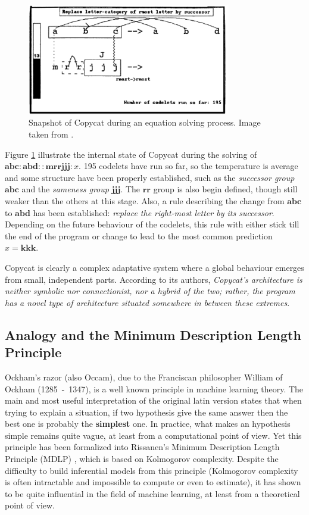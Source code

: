 \begin{figure}[!h]
\centering
  \includegraphics[width=3.5in]{figures/copycat.png}
\caption{Snapshot of Copycat during an equation solving process. Image taken
  from \cite{Mit01}.}
\label{FIG:copycat_snapshot}
\end{figure}

Figure \ref{FIG:copycat_snapshot} illustrate the internal state of Copycat
during the solving of $\mathbf{abc} : \mathbf{abd} :: \mathbf{mrrjjj}: x$. 195
codelets have run so far, so the temperature is average and some structure have
been properly established, such as the \textit{successor group} $\mathbf{abc}$
and the \textit{sameness group} $\mathbf{jjj}$. The $\mathbf{rr}$ group is also
begin defined, though still weaker than the others at this stage. Also, a rule
describing the change from $\mathbf{abc}$ to $\mathbf{abd}$ has been
established: \textit{replace the right-most letter by its successor}. Depending
on the future behaviour of the codelets, this rule with either stick till the
end of the program or change to lead to the most common prediction $x =
\mathbf{kkk}$.

Copycat is clearly a complex adaptative system where a global behaviour emerges
from small, independent parts. According to its authors, \textit{Copycat's
architecture is neither symbolic nor connectionist, nor a hybrid of the two;
rather, the program has a novel type of architecture situated somewhere in
between these extremes}.

\subsection{Analogy and the Minimum Description Length Principle}

Ockham's razor (also Occam), due to the Franciscan philosopher William
of Ockham (1285~-~1347), is a well known principle in machine learning theory.
The main and most useful interpretation of the original latin version states
that when trying to explain a situation, if two hypothesis give the same answer
then the best one is probably the \textbf{simplest} one. In practice, what
makes an hypothesis simple remains quite vague, at least from a computational
point of view. Yet this principle has been formalized into Rissanen's Minimum
Description Length Principle (MDLP) \cite{Ris78}, which is based on Kolmogorov
complexity. Despite the difficulty to build inferential models from this
principle (Kolmogorov complexity is often intractable and impossible to
compute or even to estimate), it has shown to be quite influential in the field
of machine learning, at least from a theoretical point of view.

